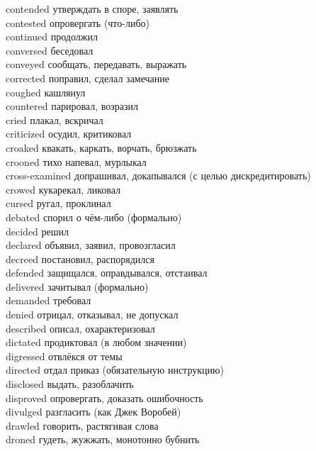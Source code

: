 \documentclass[a4paper,12pt,fleqn]{book}\usepackage{polyglossia}\setdefaultlanguage[babelshorthands=true]{russian}\setotherlanguage{english}\defaultfontfeatures{Ligatures=TeX,Mapping=tex-text}\usepackage{xcolor}\newcommand{\ml}[3]{#2}
\begin{document}
{contended \hfill утверждать в споре, заявлять\\
contested \hfill опровергать (что-либо)\\
continued \hfill продолжил\\
conversed \hfill беседовал\\
conveyed \hfill сообщать, передавать, выражать\\
corrected \hfill поправил, сделал замечание\\
coughed \hfill кашлянул\\
countered \hfill парировал, возразил\\
cried \hfill плакал, вскричал\\
criticized \hfill осудил, критиковал\\
croaked \hfill квакать, каркать, ворчать, брюзжать\\
crooned \hfill тихо напевал, мурлыкал\\
cross-examined \hfill допрашивал, докапывался (с целью дискредитировать)\\
crowed \hfill кукарекал, ликовал\\
cursed \hfill ругал, проклинал\\
debated \hfill спорил о чём-либо (формально)\\
decided \hfill решил\\
declared \hfill объявил, заявил, провозгласил\\
decreed \hfill постановил, распорядился\\
defended \hfill защищался, оправдывался, отстаивал\\
delivered \hfill зачитывал (формально)\\
demanded \hfill требовал\\
denied \hfill отрицал, отказывал, не допускал\\
described \hfill описал, охарактеризовал\\
dictated \hfill продиктовал (в любом значении)\\
digressed \hfill отвлёкся от темы\\
directed \hfill отдал приказ (обязательную инструкцию)\\
disclosed \hfill выдать, разоблачить\\
disproved \hfill опровергать, доказать ошибочность\\
divulged \hfill разгласить (как Джек Воробей)\\
drawled \hfill говорить, растягивая слова\\
droned \hfill гудеть, жужжать, монотонно бубнить\\
}
\end{document}
